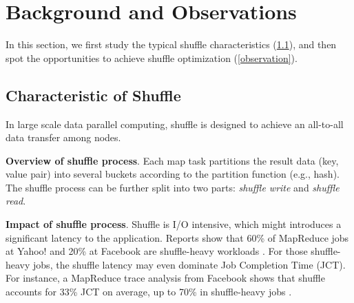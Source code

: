 \section{Background and Observations}

In this section, we first study the typical shuffle characteristics (\ref{shuffle pattern}), and then spot the opportunities to achieve shuffle optimization (\ref{observation}).
\subsection{Characteristic of Shuffle} \label{shuffle pattern}

In large scale data parallel computing, shuffle is designed to achieve an all-to-all data transfer among nodes. 

\textbf{Overview of shuffle process}. 
Each map task partitions the result data (key, value pair) into several buckets according to the partition function (e.g., hash). 
The shuffle process can be further split into two parts: \textit{shuffle write} and \textit{shuffle read}. 

\textbf{Impact of shuffle process}. Shuffle is I/O intensive, which might introduces a significant latency to the application. 
Reports show that 60\% of MapReduce jobs at Yahoo! and 20\% at Facebook are shuffle-heavy workloads \cite{shufflewatcher}. 
For those shuffle-heavy jobs, the shuffle latency may even dominate Job Completion Time (JCT).
For instance, a MapReduce trace analysis from Facebook shows that shuffle accounts for 33\% JCT on average, up to 70\% in shuffle-heavy jobs \cite{managing}.

